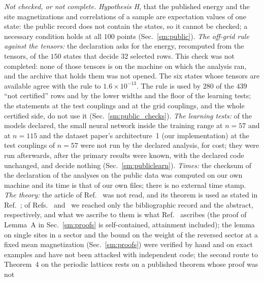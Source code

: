 \documentclass[aps,prx,onecolumn,10pt,nofootinbib,longbibliography,floatfix]{revtex4-2}
\theoremstyle{remark}
\begin{document}
\emph{Not checked, or not complete.} \emph{Hypothesis H}, that the published energy and the site magnetizations and
correlations of a sample are expectation values of one state: the public record does not contain the states, so it cannot be checked;
a necessary condition holds at all $100$ points (Sec.~\ref{sm:public}). \emph{The off-grid rule against the %
tensors:} the declaration asks for the energy, recomputed from the tensors, of the $150$ states that decide $32$ %
selected rows. This check was not completed: none of those tensors is on the machine on which the analysis ran, and
the archive that holds them was not opened. The six states whose tensors are available agree with the rule to
$1.6\times10^{-13}$. The rule is used by $280$ of the $439$ ``not certified'' rows and by the lower widths and the %
floor of the learning tests; the statements at the test couplings and at the grid couplings, and the whole
certified side, do not use it (Sec.~\ref{sm:public_checks}). \emph{The learning tests:} of the models declared, the
small neural network inside the training range at $n=57$ and at $n=115$ and the dataset paper's architecture~1 %
(our implementation) at the test couplings of $n=57$ were not run by the declared analysis, for cost; they were run %
afterwards, after the primary results were known, with the declared code unchanged, and decide nothing
(Sec.~\ref{sm:publiclearn}).
\emph{Times:} the checksum of the declaration of the analyses on the public data was computed on our own machine
and its time is that of our own files; there is no external time stamp. \emph{The theory:} the article of
Ref.~\cite{horsch1988} was not read, and its theorem is used as stated in Ref.~\cite{koma1994}; of
Refs.~\cite{cohen1971} and~\cite{eckart1930} we reached only the bibliographic record and the abstract, respectively, and what we
ascribe to them is what Ref.~\cite{manchanda2026} ascribes (the proof of Lemma~A in Sec.~\ref{sm:proofs} is
self-contained, attainment included); the lemma on single
sites in a sector and the bound on the weight of the reversed sector at a fixed mean magnetization
(Sec.~\ref{sm:proofs}) were verified by hand and on exact examples and have not been attacked with independent
code; the second route to Theorem~4 on the periodic lattices rests on a published theorem whose proof was not %
\end{document}
